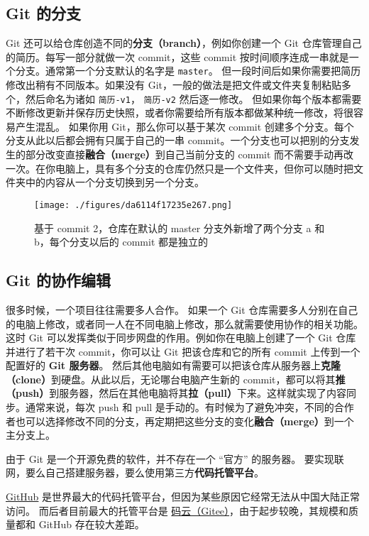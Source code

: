 \subsection{Git 的分支}
Git 还可以给仓库创造不同的\textbf{分支（branch）}，例如你创建一个 Git 仓库管理自己的简历。每写一部分就做一次 commit，这些 commit 按时间顺序连成一串就是一个分支。通常第一个分支默认的名字是 \verb`master`。 但一段时间后如果你需要把简历修改出稍有不同版本。如果没有 Git，一般的做法是把文件或文件夹复制粘贴多个，然后命名为诸如 \verb`简历-v1`， \verb`简历-v2` 然后逐一修改。 但如果你每个版本都需要不断修改更新并保存历史快照，或者你需要给所有版本都做某种统一修改，将很容易产生混乱。 如果你用 Git，那么你可以基于某次 commit 创建多个分支。每个分支从此以后都会拥有只属于自己的一串 commit。一个分支也可以把别的分支发生的部分改变直接\textbf{融合（merge）}到自己当前分支的 commit 而不需要手动再改一次。在你电脑上，具有多个分支的仓库仍然只是一个文件夹，但你可以随时把文件夹中的内容从一个分支切换到另一个分支。

\begin{figure}[ht]
\centering
\texttt{[image: ./figures/da6114f17235e267.png]}
\caption{基于 commit 2，仓库在默认的 master 分支外新增了两个分支 a 和 b，每个分支以后的 commit 都是独立的} \label{fig_GitHub_4}
\end{figure}

\subsection{Git 的协作编辑}
很多时候，一个项目往往需要多人合作。 如果一个 Git 仓库需要多人分别在自己的电脑上修改，或者同一人在不同电脑上修改，那么就需要使用协作的相关功能。 这时 Git 可以发挥类似于同步网盘的作用。例如你在电脑上创建了一个 Git 仓库并进行了若干次 commit，你可以让 Git 把该仓库和它的所有 commit 上传到一个配置好的 \textbf{Git 服务器}。 然后其他电脑如有需要可以把该仓库从服务器上\textbf{克隆（clone）}到硬盘。从此以后，无论哪台电脑产生新的 commit，都可以将其\textbf{推（push）}到服务器，然后在其他电脑将其\textbf{拉（pull）}下来。这样就实现了内容同步。通常来说，每次 push 和 pull 是手动的。有时候为了避免冲突，不同的合作者也可以选择修改不同的分支，再定期把这些分支的变化\textbf{融合（merge）}到一个主分支上。

由于 Git 是一个开源免费的软件，并不存在一个 “官方” 的服务器。 要实现联网，要么自己搭建服务器，要么使用第三方\textbf{代码托管平台}。

\href{https://github.com/}{GitHub} 是世界最大的代码托管平台，但因为某些原因它经常无法从中国大陆正常访问。 而后者目前最大的托管平台是 \href{https://gitee.com/}{码云（Gitee）}，由于起步较晚，其规模和质量都和 GitHub 存在较大差距。


